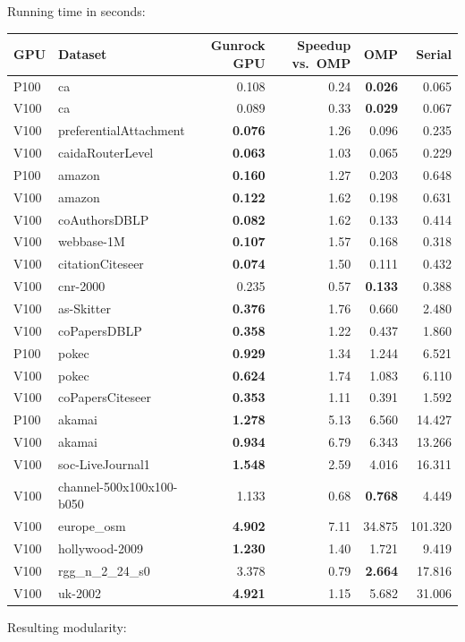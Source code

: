 \documentclass[10pt,oneside]{memoir}
\begin{document}
Running time in seconds:

\begin{longtable}[]{@{}llrrrr@{}}
\toprule
GPU & Dataset & Gunrock GPU & Speedup vs.~OMP & OMP &
Serial\tabularnewline
\midrule
\endhead
P100 & ca & 0.108 & 0.24 & \textbf{0.026} & 0.065\tabularnewline
V100 & ca & 0.089 & 0.33 & \textbf{0.029} & 0.067\tabularnewline
V100 & preferentialAttachment & \textbf{0.076} & 1.26 & 0.096 &
0.235\tabularnewline
V100 & caidaRouterLevel & \textbf{0.063} & 1.03 & 0.065 &
0.229\tabularnewline
P100 & amazon & \textbf{0.160} & 1.27 & 0.203 & 0.648\tabularnewline
V100 & amazon & \textbf{0.122} & 1.62 & 0.198 & 0.631\tabularnewline
V100 & coAuthorsDBLP & \textbf{0.082} & 1.62 & 0.133 &
0.414\tabularnewline
V100 & webbase-1M & \textbf{0.107} & 1.57 & 0.168 & 0.318\tabularnewline
V100 & citationCiteseer & \textbf{0.074} & 1.50 & 0.111 &
0.432\tabularnewline
V100 & cnr-2000 & 0.235 & 0.57 & \textbf{0.133} & 0.388\tabularnewline
V100 & as-Skitter & \textbf{0.376} & 1.76 & 0.660 & 2.480\tabularnewline
V100 & coPapersDBLP & \textbf{0.358} & 1.22 & 0.437 &
1.860\tabularnewline
P100 & pokec & \textbf{0.929} & 1.34 & 1.244 & 6.521\tabularnewline
V100 & pokec & \textbf{0.624} & 1.74 & 1.083 & 6.110\tabularnewline
V100 & coPapersCiteseer & \textbf{0.353} & 1.11 & 0.391 &
1.592\tabularnewline
P100 & akamai & \textbf{1.278} & 5.13 & 6.560 & 14.427\tabularnewline
V100 & akamai & \textbf{0.934} & 6.79 & 6.343 & 13.266\tabularnewline
V100 & soc-LiveJournal1 & \textbf{1.548} & 2.59 & 4.016 &
16.311\tabularnewline
V100 & channel-500x100x100-b050 & 1.133 & 0.68 & \textbf{0.768} &
4.449\tabularnewline
V100 & europe\_osm & \textbf{4.902} & 7.11 & 34.875 &
101.320\tabularnewline
V100 & hollywood-2009 & \textbf{1.230} & 1.40 & 1.721 &
9.419\tabularnewline
V100 & rgg\_n\_2\_24\_s0 & 3.378 & 0.79 & \textbf{2.664} &
17.816\tabularnewline
V100 & uk-2002 & \textbf{4.921} & 1.15 & 5.682 & 31.006\tabularnewline
\bottomrule
\end{longtable}

Resulting modularity:
\end{document}
